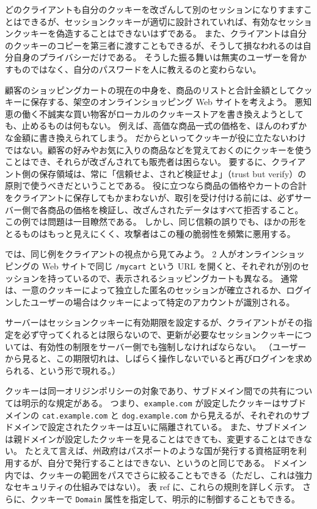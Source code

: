 \documentclass[uplatex]{jsarticle}
\def\ref#1{ref}%
\def\label#1{}%
\begin{document}
どのクライアントも自分のクッキーを改ざんして別のセッションになりすますことはできるが、セッションクッキーが適切に設計されていれば、有効なセッションクッキーを偽造することはできないはずである。
また、クライアントは自分のクッキーのコピーを第三者に渡すこともできるが、そうして損なわれるのは自分自身のプライバシーだけである。
そうした振る舞いは無実のユーザーを脅かすものではなく、自分のパスワードを人に教えるのと変わらない。

\begin{exa}[クッキーに保存したショッピングカート]\label{exa:ch11-cart-cookie}
顧客のショッピングカートの現在の中身を、商品のリストと合計金額としてクッキーに保存する、架空のオンラインショッピング Web サイトを考えよう。
悪知恵の働く不誠実な買い物客がローカルのクッキーストアを書き換えようとしても、止めるものは何もない。
例えば、高価な商品一式の価格を、ほんのわずかな金額に書き換えられてしまう。
だからといってクッキーが役に立たないわけではない。顧客の好みやお気に入りの商品などを覚えておくのにクッキーを使うことはでき、それらが改ざんされても販売者は困らない。
要するに、クライアント側の保存領域は、常に「信頼せよ、されど検証せよ」（trust but verify）の原則で使うべきだということである。
役に立つなら商品の価格やカートの合計をクライアントに保存してもかまわないが、取引を受け付ける前には、必ずサーバー側で各商品の価格を検証し、改ざんされたデータはすべて拒否すること。
この例では問題は一目瞭然である。
しかし、同じ信頼の誤りでも、ほかの形をとるものはもっと見えにくく、攻撃者はこの種の脆弱性を頻繁に悪用する。
\end{exa}

では、同じ例をクライアントの視点から見てみよう。
2 人がオンラインショッピングの Web サイトで同じ \texttt{/mycart} という URL を開くと、それぞれが別のセッションを持っているので、表示されるショッピングカートも異なる。
通常は、一意のクッキーによって独立した匿名のセッションが確立されるか、ログインしたユーザーの場合はクッキーによって特定のアカウントが識別される。

サーバーはセッションクッキーに有効期限を設定するが、クライアントがその指定を必ず守ってくれるとは限らないので、更新が必要なセッションクッキーについては、有効性の制限をサーバー側でも強制しなければならない。
（ユーザーから見ると、この期限切れは、しばらく操作しないでいると再びログインを求められる、という形で現れる。）

クッキーは同一オリジンポリシーの対象であり、サブドメイン間での共有については明示的な規定がある。
つまり、\texttt{example.com} が設定したクッキーはサブドメインの \texttt{cat.example.com} と \texttt{dog.example.com} から見えるが、それぞれのサブドメインで設定されたクッキーは互いに隔離されている。
また、サブドメインは親ドメインが設定したクッキーを見ることはできても、変更することはできない。
たとえて言えば、州政府はパスポートのような国が発行する資格証明を利用するが、自分で発行することはできない、というのと同じである。
ドメイン内では、クッキーの範囲をパスでさらに絞ることもできる（ただし、これは強力なセキュリティの仕組みではない）。
表 \ref{tab:ch11-cookie-sharing} に、これらの規則を詳しく示す。
さらに、クッキーで \texttt{Domain} 属性を指定して、明示的に制御することもできる。
\end{document}
